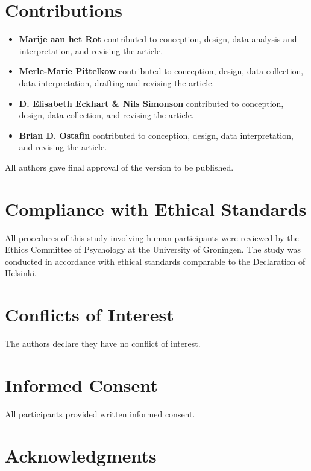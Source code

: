 \documentclass[authordate, empirical]{jote-new-article}
\begin{document}
    \section{Contributions}
    \begin{itemize}
        \item \textbf{Marije aan het Rot} contributed to conception, design, data analysis and interpretation, and revising the article.
        \item \textbf{Merle-Marie Pittelkow} contributed to conception, design, data collection, data interpretation, drafting and revising the article.
        \item \textbf{D. Elisabeth Eckhart \& Nils Simonson} contributed to conception, design, data collection, and revising the article. 
        \item \textbf{Brian D. Ostafin} contributed to conception, design, data interpretation, and revising the article.
    \end{itemize} 
    All authors gave final approval of the version to be published.
    

	\section{Compliance with Ethical Standards}



	All procedures of this study involving human participants were reviewed by the Ethics Committee of Psychology at the University of Groningen.\emph{\textbf{ }}The study was conducted in accordance with ethical standards comparable to the Declaration of Helsinki.



	\section{Conflicts of Interest}

	The authors declare they have no conflict of interest.

    \section{Informed Consent}
    All participants provided written informed consent.

    \newpage


	\section{Acknowledgments}
\end{document}
